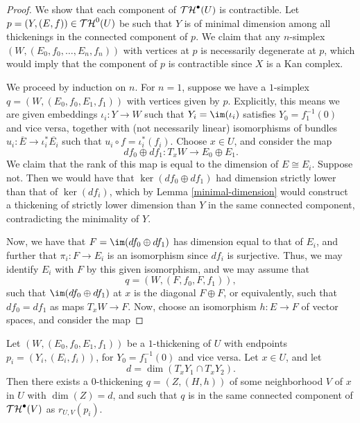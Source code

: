 \begin{proof}

We show that each component of ${\mathcal T \mathcal H}^\bullet(U)$ is contractible. Let $p = (Y, (E, f)) \in {\mathcal T\mathcal H}^0(U)$ be such that $Y$ is of minimal dimension among all thickenings in the connected component of $p$. We claim that any $n$-simplex $(W, (E_0, f_0, \dots, E_n, f_n))$ with vertices at $p$ is necessarily degenerate at $p$, which would imply that the component of $p$ is contractible since $X$ is a Kan complex.

We proceed by induction on $n$. For $n = 1$, suppose we have a $1$-simplex $q = (W, (E_0, f_0, E_1, f_1))$ with vertices given by $p$. Explicitly, this means we are given embeddings $\iota_i : Y \to W$ such that $Y_i = \im(\iota_i)$ satisfies $Y_0 = f_1^{-1}(0)$ and vice versa, together with (not necessarily linear) isomorphisms of bundles $u_i: \overline{E} \to \iota_i^* \overline{E_i}$ such that $u_i \circ f = \iota_i^* (f_i)$. Choose $x \in U$, and consider the map
\[ df_0 \oplus df_1 : T_x W \to E_0 \oplus E_1. \]
We claim that the rank of this map is equal to the dimension of $E \cong E_i$. Suppose not. Then we would have that $\ker(df_0 \oplus df_1)$ had dimension strictly lower than that of $\ker(df_i)$, which by Lemma \ref{minimal-dimension} would construct a thickening of strictly lower dimension than $Y$ in the same connected component, contradicting the minimality of $Y$.

Now, we have that $F = \im(df_0 \oplus df_1)$ has dimension equal to that of $E_i$, and further that $\pi_i : F \to E_i$ is an isomorphism since $df_i$ is surjective. Thus, we may identify $E_i$ with $F$ by this given isomorphism, and we may assume that
\[ q = (W, (F, f_0, F, f_1)), \]
such that $\im(df_0 \oplus df_1)$ at $x$ is the diagonal $F \oplus F$, or equivalently, such that $df_0 = df_1$ as maps $T_x W \to F$. Now, choose an isomorphism $h: E \to F$ of vector spaces, and consider the map

\end{proof}

\begin{lemma}\label{minimal-dimension}
Let $(W, (E_0, f_0, E_1, f_1))$ be a $1$-thickening of $U$ with endpoints $p_i = (Y_i, (E_i, f_i))$, for $Y_0 = f_1^{-1}(0)$ and vice versa. Let $x \in U$, and let
\[d = \dim(T_x Y_1 \cap T_x Y_2).\]
Then there exists a $0$-thickening $q = (Z, (H, h))$ of some neighborhood $V$ of $x$ in $U$ with $\dim(Z) = d$, and such that $q$ is in the same connected component of ${\mathcal T \mathcal H}^\bullet(V)$ as $r_{U, V}(p_i)$.
\end{lemma}

